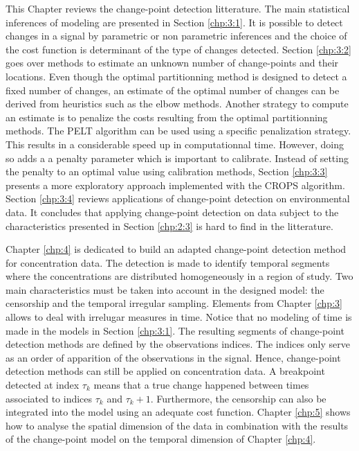 This Chapter reviews the change-point detection litterature. The main statistical inferences of modeling are presented in Section \ref{chp:3:1}. It is possible to detect changes in a signal by parametric or non parametric inferences and the choice of the cost function is determinant of the type of changes detected. Section \ref{chp:3:2} goes over methods to estimate an unknown number of change-points and their locations. Even though the optimal partitionning method is designed to detect a fixed number of changes, an estimate of the optimal number of changes can be derived from heuristics such as the elbow methods. Another strategy to compute an estimate is to penalize the costs resulting from the optimal partitionning methods. The PELT algorithm can be used using a specific penalization strategy. This results in a considerable speed up in computationnal time. However, doing so adds a a penalty parameter which is important to calibrate. Instead of setting the penalty to an optimal value using calibration methods, Section \ref{chp:3:3} presents a more exploratory approach implemented with the CROPS algorithm. Section \ref{chp:3:4} reviews applications of change-point detection on environmental data. It concludes that applying change-point detection on data subject to the characteristics presented in Section \ref{chp:2:3} is hard to find in the litterature.  
 
Chapter \ref{chp:4} is dedicated to build an adapted change-point detection method for concentration data. The detection is made to identify temporal segments where the concentrations are distributed homogeneously in a region of study. Two main characteristics must be taken into account in the designed model: the censorship and the temporal irregular sampling. Elements from Chapter \ref{chp:3} allows to deal with irrelugar measures in time. Notice that no modeling of time is made in the models in Section \ref{chp:3:1}. The resulting segments of change-point detection methods are defined by the observations indices. The indices only serve as an order of apparition of the observations in the signal. Hence, change-point detection methods can still be applied on concentration data. A breakpoint detected at index $\tau_k$ means that a true change happened between times associated to indices $\tau_{k}$ and $\tau_{k}+1$. Furthermore, the censorship can also be integrated into the model using an adequate cost function. Chapter \ref{chp:5} shows how to analyse the spatial dimension of the data in combination with the results of the change-point model on the temporal dimension of Chapter \ref{chp:4}.        


 

 